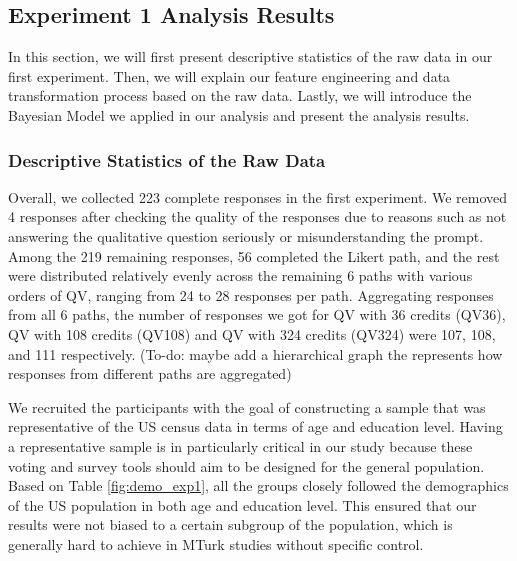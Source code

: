 \subsection{Experiment 1 Analysis Results} \label{results-1-quan}
In this section, 
we will first present descriptive statistics 
of the raw data in our first experiment. 
Then, we will explain our feature engineering 
and data transformation process 
based on the raw data. 
Lastly, we will introduce the Bayesian Model 
we applied in our analysis 
and present the analysis results.

\subsubsection{Descriptive Statistics of the Raw Data}
    
Overall, we collected 223 complete responses in the first experiment. We removed 4 responses after checking the quality of the responses due to reasons such as not answering the qualitative question seriously or misunderstanding the prompt. Among the 219 remaining responses, 56 completed the Likert path, and the rest were distributed relatively evenly across the remaining 6 paths with various orders of QV, ranging from 24 to 28 responses per path. Aggregating responses from all 6 paths, the number of responses we got for QV with 36 credits (QV36), QV with 108 credits (QV108) and QV with 324 credits (QV324) were 107, 108, and 111 respectively. (To-do: maybe add a hierarchical graph the represents how responses from different paths are aggregated)

We recruited the participants with the goal of constructing a sample that was representative of the US census data in terms of age and education level. Having a representative sample is in particularly critical in our study because these voting and survey tools should aim to be designed for the general population. Based on Table \ref{fig:demo_exp1}, all the groups closely followed the demographics of the US population in both age and education level. This ensured that our results were not biased to a certain subgroup of the population, which is generally hard to achieve in MTurk studies without specific control. 


